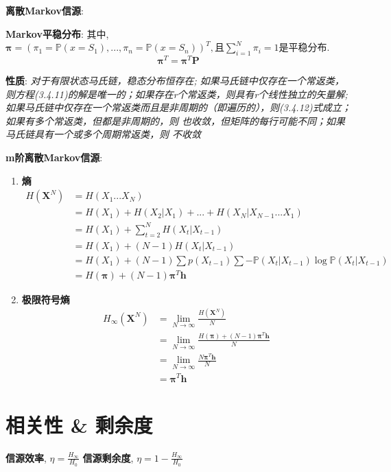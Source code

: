 \documentclass{article}
\newcommand{\env}[2]{\begin{#1}#2\end{#1}}
\newcommand{\defi}[2]{\textbf{#1}, #2}
\newcommand{\bb}{\boldsymbol}
\newcommand{\P}{\mathbb P}
\begin{document}
        \textbf{离散Markov信源}:
        
            \textbf{Markov平稳分布}: 其中, $\bb \pi = (\pi_1 = \P(x = S_1), ..., \pi_n = \P(x = S_n))^T, \text{且} \sum\limits_{i=1}^N \pi_i = 1$是平稳分布.
                $$\bb \pi^T = \bb \pi^T \bb P$$
                
                \textbf{性质}: \textit{对于有限状态马氏链，稳态分布恒存在; 如果马氏链中仅存在一个常返类，则方程(3.4.11)的解是唯一的；如果存在r个常返类，则具有r个线性独立的矢量解; 如果马氏链中仅存在一个常返类而且是非周期的（即遍历的），则(3.4.12)式成立；如果有多个常返类，但都是非周期的，则       也收敛，但矩阵的每行可能不同；如果马氏链具有一个或多个周期常返类，则      不收敛}

        \textbf{m阶离散Markov信源}:
            \env{enumerate}{
            \item \textbf{熵}
                \env{align*}{
                    H(\bb X^N) &= H(X_1 ... X_N)\\
                    &= H(X_1) + H(X_2|X_1) + ... + H(X_N | X_{N-1} ... X_1) \tag{条件熵展开}\\
                    &= H(X_1) + \sum\limits_{t=2}^N H(X_t | X_{t-1}) \tag{Markov性}\\
                    &= H(X_1) + (N-1) H(X_t | X_{t-1}) \tag{平稳性}\\
                    &= H(X_1) + (N-1) \sum p(X_{t-1}) \sum - \P(X_t | X_{t-1}) \log \P(X_t | X_{t-1}) \tag{条件熵代入}\\
                    &= H(\bb \pi) + (N-1)  \bb \pi^T \bb h \tag{平稳分布$\bb \pi$代入}
                }
            \item \textbf{极限符号熵}
                \env{align*}{
                    H_\infty(\bb X^N) &= \lim\limits_{N \to \infty}\frac{H(\bb X^N)}{N} \tag{定义}\\
                    &= \lim\limits_{N \to \infty} \frac{H(\bb \pi) + (N-1)  \bb \pi^T \bb h}{N} \tag{代入}\\
                    &= \lim\limits_{N \to \infty} \frac{N \bb \pi^T \bb h}{N} \tag{省略$\to 0$量}\\
                    &= \bb \pi^T \bb h
                }
            }


    \section{相关性 \& 剩余度}
        \defi{信源效率}{$\eta = \frac{H_\infty}{H_0}$}
        \defi{信源剩余度}{$\eta = 1 - \frac{H_\infty}{H_0}$}
            
\end{document}
